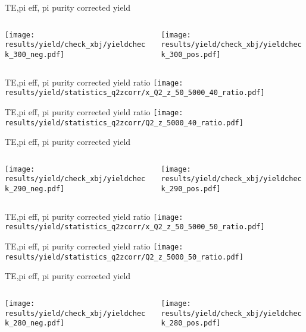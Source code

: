 \begin{frame}{TE,pi eff, pi purity corrected yield}
\begin{columns}
\begin{column}[T]{0.5\textwidth}
\texttt{[image: results/yield/check\_xbj/yieldcheck\_300\_neg.pdf]}
\end{column}
\begin{column}[T]{0.5\textwidth}
\texttt{[image: results/yield/check\_xbj/yieldcheck\_300\_pos.pdf]}
\end{column}
\end{columns}
\end{frame}
\begin{frame}{TE,pi eff, pi purity corrected yield ratio}
\texttt{[image: results/yield/statistics\_q2zcorr/x\_Q2\_z\_50\_5000\_40\_ratio.pdf]}
\end{frame}
\begin{frame}{TE,pi eff, pi purity corrected yield ratio}
\texttt{[image: results/yield/statistics\_q2zcorr/Q2\_z\_5000\_40\_ratio.pdf]}
\end{frame}
\begin{frame}{TE,pi eff, pi purity corrected yield}
\begin{columns}
\begin{column}[T]{0.5\textwidth}
\texttt{[image: results/yield/check\_xbj/yieldcheck\_290\_neg.pdf]}
\end{column}
\begin{column}[T]{0.5\textwidth}
\texttt{[image: results/yield/check\_xbj/yieldcheck\_290\_pos.pdf]}
\end{column}
\end{columns}
\end{frame}
\begin{frame}{TE,pi eff, pi purity corrected yield ratio}
\texttt{[image: results/yield/statistics\_q2zcorr/x\_Q2\_z\_50\_5000\_50\_ratio.pdf]}
\end{frame}
\begin{frame}{TE,pi eff, pi purity corrected yield ratio}
\texttt{[image: results/yield/statistics\_q2zcorr/Q2\_z\_5000\_50\_ratio.pdf]}
\end{frame}
\begin{frame}{TE,pi eff, pi purity corrected yield}
\begin{columns}
\begin{column}[T]{0.5\textwidth}
\texttt{[image: results/yield/check\_xbj/yieldcheck\_280\_neg.pdf]}
\end{column}
\begin{column}[T]{0.5\textwidth}
\texttt{[image: results/yield/check\_xbj/yieldcheck\_280\_pos.pdf]}
\end{column}
\end{columns}
\end{frame}
